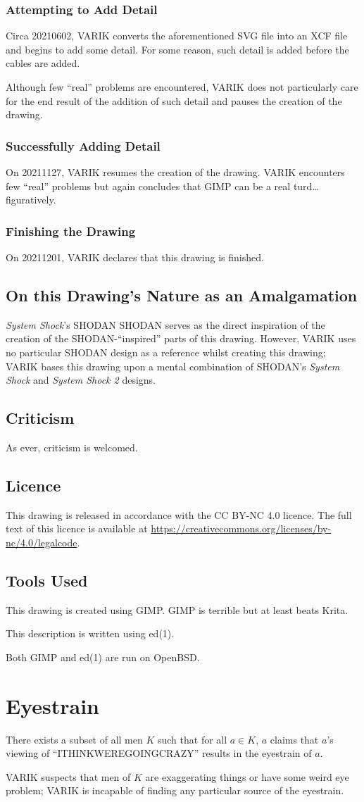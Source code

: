 \documentclass{report}
\begin{document}
\subsubsection{Attempting to Add Detail}
Circa 20210602, VARIK converts the aforementioned SVG file into an XCF file and begins to add some detail.  For some reason, such detail is added before the cables are added.

Although few ``real'' problems are encountered, VARIK does not particularly care for the end result of the addition of such detail and pauses the creation of the drawing.
\subsubsection{Successfully Adding Detail}
On 20211127, VARIK resumes the creation of the drawing.  VARIK encounters few ``real'' problems but again concludes that GIMP can be a real turd\ldots figuratively.
\subsubsection{Finishing the Drawing}
On 20211201, VARIK declares that this drawing is finished.
\subsection{On this Drawing's Nature as an Amalgamation}
\textit{System Shock}'s SHODAN SHODAN serves as the direct inspiration of the creation of the SHODAN-``inspired'' parts of this drawing.  However, VARIK uses no particular SHODAN design as a reference whilst creating this drawing; VARIK bases this drawing upon a mental combination of SHODAN's \textit{System Shock} and \textit{System Shock 2} designs.
\subsection{Criticism}
As ever, criticism is welcomed.
\subsection{Licence}
This drawing is released in accordance with the CC BY-NC 4.0 licence.  The full text of this licence is available at \url{https://creativecommons.org/licenses/by-nc/4.0/legalcode}.
\subsection{Tools Used}
This drawing is created using GIMP\@.  GIMP is terrible but at least beats Krita.

This description is written using ed(1).

Both GIMP and ed(1) are run on OpenBSD\@.
\section{Eyestrain}
There exists a subset of all men $K$ such that for all $a \in K$, $a$ claims that $a$'s viewing of ``ITHINKWEREGOINGCRAZY'' results in the eyestrain of $a$.

VARIK suspects that men of $K$ are exaggerating things or have some weird eye problem; VARIK is incapable of finding any particular source of the eyestrain.
\end{document}
